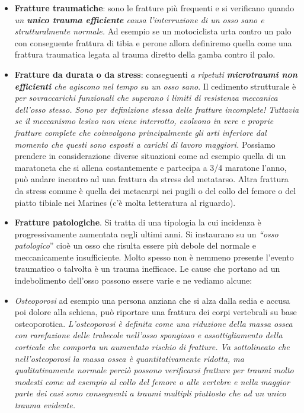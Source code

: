 \documentclass[]{article}
\begin{document}
\begin{itemize}
\item
  \textbf{Fratture traumatiche}: sono le fratture più frequenti e si
  verificano quando \emph{un \textbf{unico trauma efficiente} causa
  l'interruzione di un osso sano e strutturalmente normale.} Ad esempio
  se un motociclista urta contro un palo con conseguente frattura di
  tibia e perone allora definiremo quella come una frattura traumatica
  legata al trauma diretto della gamba contro il palo.
\item
  \textbf{Fratture da durata o da stress}: conseguenti \emph{a ripetuti
  \textbf{microtraumi non efficienti} che agiscono nel tempo su un osso
  sano}. Il cedimento strutturale è \emph{per sovraccarichi funzionali
  che superano i limiti di resistenza meccanica dell'osso stesso. Sono
  per definizione stessa delle fratture incomplete! Tuttavia se il
  meccanismo lesivo non viene interrotto, evolvono in vere e proprie
  fratture complete che coinvolgono principalmente gli arti inferiore
  dal momento che questi sono esposti a carichi di lavoro maggiori.}
  Possiamo prendere in considerazione diverse situazioni come ad esempio
  quella di un maratoneta che si allena costantemente e partecipa a 3/4
  maratone l'anno, può andare incontro ad una frattura da stress del
  metatarso. Altra frattura da stress comune è quella dei metacarpi nei
  pugili o del collo del femore o del piatto tibiale nei Marines (c'è
  molta letteratura al riguardo).
\item
  \textbf{Fratture patologiche}. Si tratta di una tipologia la cui
  incidenza è progressivamente aumentata negli ultimi anni. Si
  instaurano su un \emph{``osso patologico}'' cioè un osso che risulta
  essere più debole del normale e meccanicamente insufficiente. Molto
  spesso non è nemmeno presente l'evento traumatico o talvolta è un
  trauma inefficace. Le cause che portano ad un indebolimento dell'osso
  possono essere varie e ne vediamo alcune:
\end{itemize}

\begin{itemize}
\item
  \emph{Osteoporosi} ad esempio una persona anziana che si alza dalla
  sedia e accusa poi dolore alla schiena, può riportare una frattura dei
  corpi vertebrali su base osteoporotica. \emph{L'osteoporosi è definita
  come una riduzione della massa ossea con rarefazione delle trabecole
  nell'osso spongioso e assottigliamento della corticale che comporta un
  aumentato rischio di fratture. Va sottolineato che nell'osteoporosi la
  massa ossea è quantitativamente ridotta, ma qualitativamente normale
  perciò possono verificarsi fratture per traumi molto modesti come ad
  esempio al collo del femore o alle vertebre e nella maggior parte dei
  casi sono conseguenti a traumi multipli piuttosto che ad un unico
  trauma evidente.}
\end{itemize}
\end{document}
